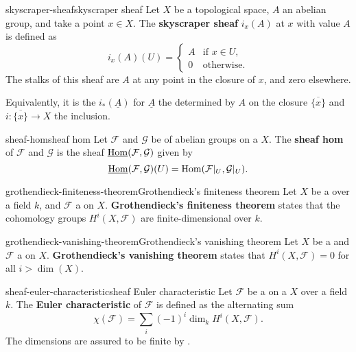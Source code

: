 \begin{topic}{skyscraper-sheaf}{skyscraper sheaf}
    Let $X$ be a topological space, $A$ an abelian group, and take a point $x \in X$. The \textbf{skyscraper sheaf} $i_x(A)$ at $x$ with value $A$ is defined as
    \[ i_x(A) (U) = \left\{ \begin{array}{cl} A & \text{if } x \in U, \\ 0 & \text{otherwise.} \end{array} \right. \]
    The stalks of this sheaf are $A$ at any point in the closure of $x$, and zero elsewhere.
    
    Equivalently, it is the  $i_*(\underline{A})$ for $\underline{A}$ the  determined by $A$ on the closure $\overline{\{ x \}}$ and $i \colon \overline{\{ x \}} \to X$ the inclusion.
\end{topic}

\begin{topic}{sheaf-hom}{sheaf hom}
    Let $\mathcal{F}$ and $\mathcal{G}$ be  of abelian groups on a  $X$. The \textbf{sheaf hom} of $\mathcal{F}$ and $\mathcal{G}$ is the sheaf $\operatorname{\underline{Hom}}(\mathcal{F}, \mathcal{G})$ given by
    \[ \operatorname{\underline{Hom}}(\mathcal{F}, \mathcal{G})(U) = \operatorname{Hom}(\mathcal{F}|_U, \mathcal{G}|_U) . \]
\end{topic}

\begin{topic}{grothendieck-finiteness-theorem}{Grothendieck's finiteness theorem}
    Let $X$ be a   over a field $k$, and $\mathcal{F}$ a  on $X$. \textbf{Grothendieck's finiteness theorem} states that the cohomology groups $H^i(X, \mathcal{F})$ are finite-dimensional over $k$.
\end{topic}

\begin{topic}{grothendieck-vanishing-theorem}{Grothendieck's vanishing theorem}
    Let $X$ be a   and $\mathcal{F}$ a  on $X$. \textbf{Grothendieck's vanishing theorem} states that $H^i(X, \mathcal{F}) = 0$ for all $i > \dim(X)$.
\end{topic}

\begin{topic}{sheaf-euler-characteristic}{sheaf Euler characteristic}
    Let $\mathcal{F}$ be a  on a  $X$  over a field $k$. The \textbf{Euler characteristic} of $\mathcal{F}$ is defined as the alternating sum
    \[ \chi(\mathcal{F}) = \sum_{i} (-1)^i \dim_k H^i(X, \mathcal{F}) . \]
    The dimensions are assured to be finite by .
\end{topic}

